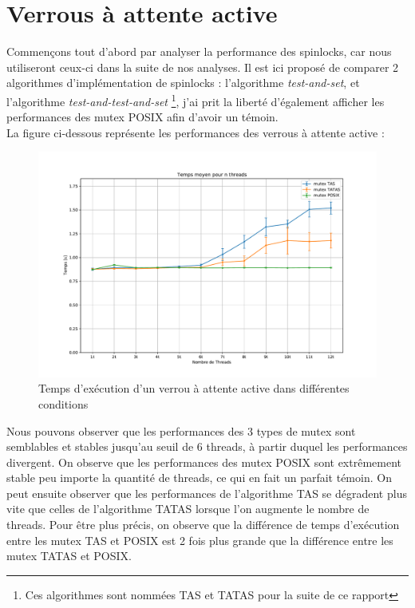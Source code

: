 \section{Verrous à attente active}

Commençons tout d'abord par analyser la performance des spinlocks, car nous utiliseront ceux-ci dans la suite de nos analyses. Il est ici proposé de comparer
2 algorithmes d'implémentation de spinlocks : l'algorithme \textit{test-and-set}, et l'algorithme \textit{test-and-test-and-set} \footnote{Ces algorithmes sont nommées TAS et TATAS pour la suite de ce rapport}, j'ai prit la liberté d'également afficher les performances des mutex POSIX afin d'avoir un témoin. \\

La figure ci-dessous représente les performances des verrous à attente active :
\begin{figure}[h!]
    \centering
    \includegraphics[scale=0.4]{img/spinlock.pdf}
    \caption{Temps d'exécution d'un verrou à attente active dans différentes conditions}
    \label{pic:spinlock}
\end{figure}

\noindent Nous pouvons observer que les performances des 3 types de mutex sont semblables et stables jusqu'au seuil de 6 threads, à partir duquel les performances divergent. On observe que les performances des mutex POSIX sont extrêmement stable peu importe la quantité de threads, ce qui en fait un parfait témoin.
On peut ensuite observer que les performances de l'algorithme TAS se dégradent plus vite que celles de l'algorithme TATAS lorsque l'on augmente le nombre de threads. Pour être plus précis, on observe que la différence de temps d'exécution entre les mutex TAS et POSIX est 2 fois plus grande que la différence entre les mutex TATAS et POSIX. \\

